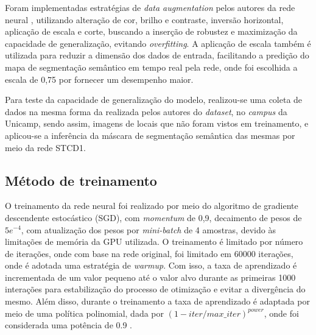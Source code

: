 \documentclass[conference]{IEEEtran}
\begin{document}
Foram implementadas estratégias de \textit{data augmentation} pelos autores da rede neural \cite{fan2021RethinkingBiSeNetRealtime}, utilizando alteração de cor, brilho e contraste, inversão horizontal, aplicação de escala e corte, buscando a inserção de robustez e maximização da capacidade de generalização, evitando \textit{overfitting}. A aplicação de escala também é utilizada para reduzir a dimensão dos dados de entrada, facilitando a predição do mapa de segmentação semântico em tempo real pela rede, onde foi escolhida a escala de 0,75 por fornecer um desempenho maior.

Para teste da capacidade de generalização do modelo, realizou-se uma coleta de dados na mesma forma da realizada pelos autores do \textit{dataset}, no \textit{campus} da Unicamp, sendo assim, imagens de locais que não foram vistos em treinamento, e aplicou-se a inferência da máscara de segmentação semântica das mesmas por meio da rede STCD1.

\subsection{Método de treinamento}


O treinamento da rede neural foi realizado por meio do algoritmo de gradiente descendente estocástico (SGD), com \textit{momentum} de 0,9, decaimento de pesos de $5e^{-4}$, com atualização dos pesos por \textit{mini-batch} de 4 amostras, devido às limitações de memória da GPU utilizada. O treinamento é limitado por número de iterações, onde com base na rede original, foi limitado em 60000 iterações, onde é adotada uma estratégia de \textit{warmup}. Com isso, a taxa de aprendizado é incrementada de um valor pequeno até o valor alvo durante as primeiras 1000 interações para estabilização do processo de otimização e evitar a divergência do mesmo. Além disso, durante o treinamento a taxa de aprendizado é adaptada por meio de uma política polinomial, dada por $(1 - iter/max\_iter)^{power}$, onde foi considerada uma potência de 0.9 \cite{fan2021RethinkingBiSeNetRealtime}.
\end{document}
